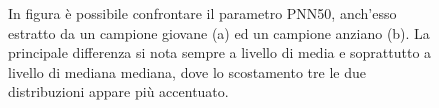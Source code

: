 \documentclass[12pt,a4paper, twoside, openright]{report}
\begin{document}
\begin{figure}[h!]
	\centering
	\hfill
	\caption{In figura è possibile confrontare il parametro PNN50, anch'esso estratto da un campione giovane (a) ed un campione anziano (b).
	La principale differenza si nota sempre a livello di media e soprattutto a livello di mediana mediana, dove lo scostamento tre le due distribuzioni appare più accentuato.}
	\label{fig:PNN50}
\end{figure}
\end{document}
